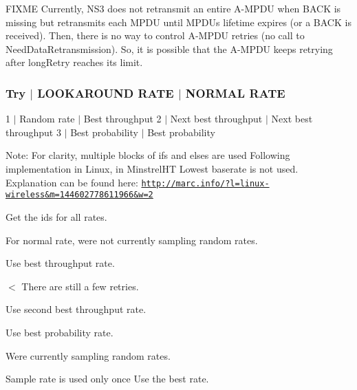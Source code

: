 F\+I\+X\+ME Currently, N\+S3 does not retransmit an entire A-\/\+M\+P\+DU when B\+A\+CK is missing but retransmits each M\+P\+DU until M\+P\+D\+Us lifetime expires (or a B\+A\+CK is received). Then, there is no way to control A-\/\+M\+P\+DU retries (no call to Need\+Data\+Retransmission). So, it is possible that the A-\/\+M\+P\+DU keeps retrying after long\+Retry reaches its limit.

\subsubsection*{Try $\vert$ L\+O\+O\+K\+A\+R\+O\+U\+ND R\+A\+TE $\vert$ N\+O\+R\+M\+AL R\+A\+TE }

1 $\vert$ Random rate $\vert$ Best throughput 2 $\vert$ Next best throughput $\vert$ Next best throughput 3 $\vert$ Best probability $\vert$ Best probability

Note\+: For clarity, multiple blocks of if\textquotesingle{}s and else\textquotesingle{}s are used Following implementation in Linux, in Minstrel\+HT Lowest baserate is not used. Explanation can be found here\+: \href{http://marc.info/?l=linux-wireless&m=144602778611966&w=2}{\tt http\+://marc.\+info/?l=linux-\/wireless\&m=144602778611966\&w=2}

Get the ids for all rates.

For normal rate, we\textquotesingle{}re not currently sampling random rates.

Use best throughput rate.

$<$ There are still a few retries.

Use second best throughput rate.

Use best probability rate.

We\textquotesingle{}re currently sampling random rates.

Sample rate is used only once Use the best rate.


